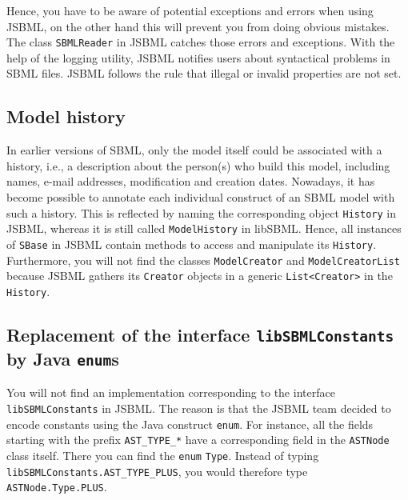 Hence, you have to be aware of potential exceptions and errors when using JSBML,
%
on the other hand this will prevent you from doing obvious mistakes. The class
\texttt{SBMLReader} in JSBML catches those errors and exceptions. With the help
of the logging utility, JSBML notifies users about syntactical problems in SBML
files. JSBML follows the rule that illegal or invalid properties are not set.


\subsection{Model history}

In earlier versions of SBML, only the model itself could be
associated with a history, i.e., a description about the person(s) who build
this model, including names, e-mail addresses, modification and creation dates.
Nowadays, it has become possible to annotate each individual construct of an
SBML model with such a history. This is reflected by naming the corresponding
object \texttt{History}
in JSBML, whereas it is still called
\texttt{ModelHistory} in libSBML. Hence,
all instances of \texttt{SBase} in JSBML
 contain methods to access and
manipulate its \texttt{History}. Furthermore, you will not find the classes
\texttt{ModelCreator} and \texttt{ModelCreatorList} because
JSBML
gathers its \texttt{Creator} objects
in a generic \texttt{List<Creator>} in the
\texttt{History}.


\subsection{Replacement of the interface \texttt{libSBMLConstants} by Java \texttt{enum}s}

You will not find an implementation corresponding to the interface
\texttt{libSBMLConstants} in JSBML. The reason is that the JSBML team decided to
encode constants
%
using the Java construct \texttt{enum}. For instance, all the fields starting
with the prefix \texttt{AST\_TYPE\_*}
%
have a corresponding field in the \texttt{ASTNode} class itself. There you can
find the \texttt{enum} \texttt{Type}.
%
Instead of typing \texttt{libSBMLConstants.AST\_TYPE\_PLUS}, you would therefore
type \texttt{ASTNode.Type.PLUS}.

